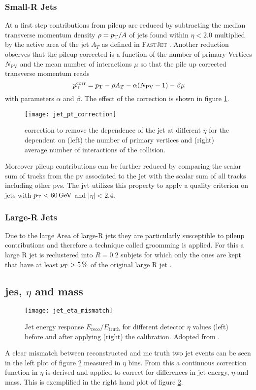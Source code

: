 \subsubsection*{Small-R Jets}
At a first step contributions from pileup are reduced by subtracting the median transverse momentum density $\rho=p_{\text{T}} / A$ of jets found within $\eta<2.0$ multiplied by the active area of the jet $A_T$ as defined in \textsc{FastJet} \citep{cacciari2012fastjet}. Another reduction observes that the pileup corrected \pt is a function of the number of primary Vertices $N_\text{PV}$ and the mean number of interactions $\mu$ so that the pile up corrected transverse momentum reads
\begin{equation}
  p_{\text{T}}^\text{corr}=p_{\text{T}}-\rho A_T -\alpha(N_\text{PV}-1)-\beta\mu
\end{equation}
with parameters $\alpha$ and $\beta$. The effect of the correction is shown in figure \ref{fig:jet_pt_correction}.
\begin{figure}
  \centering
  \texttt{[image: jet\_pt\_correction]}
  \caption[]{\pt correction to remove the \pt dependence of the jet at different $\eta$ for the \pt dependent on (left) the number of primary vertices and (right) average number of interactions of the collision.}
  \label{fig:jet_pt_correction}
\end{figure}

Moreover pileup contributions can be further reduced by comparing the scalar \pt sum of tracks from the \ac{pv} associated to the jet with the scalar \pt sum of all tracks including other \acp{pv}. The \ac{jvt} \citep{ATLAS-CONF-2014-018} utilizes this property to apply a quality criterion on jets with $p_{\text{T}}<\qty[]{60}{GeV}$ and $|\eta|<2.4$.


\subsubsection*{Large-R Jets}
Due to the large Area of large-R jets they are particularly susceptible to pileup contributions and therefore a technique called groomming is applied. For this a large R jet is reclustered into $R=0.2$ subjets for which only the ones are kept that have at least $p_{\text{T}}>\qty[]{5}{\percent}$ of the original large R jet \pt.

\subsection{\ac{jes}, $\eta$ and mass}
\begin{figure}
  \centering
  \texttt{[image: jet\_eta\_mismatch]}
  \caption[]{Jet energy response $E_\text{reco}/E_\text{truth}$ for different detector $\eta$ values (left) before and after applying (right) the calibration. Adopted from \citep{jet_eta_calib}.}
  \label{fig:jet_eta_mismatch}
\end{figure}
A clear mismatch between reconstructed and \ac{mc} truth two jet events can be seen in the left plot of figure \ref{fig:jet_eta_mismatch} measured in $\eta$ bins. From this a continuous correction function in $\eta$ is derived and applied to correct for differences in jet energy, $\eta$ and mass. This is exemplified in the right hand plot of figure \ref{fig:jet_eta_mismatch}.

